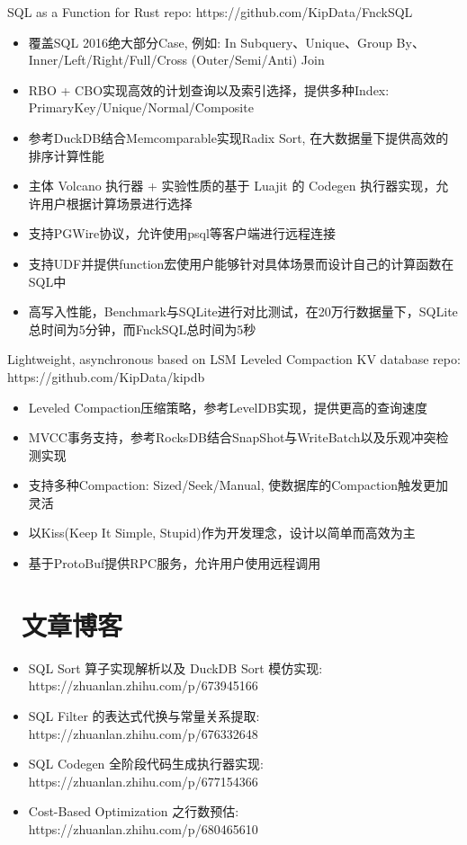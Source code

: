 \documentclass{resume}
\begin{document}
\begin{onehalfspacing}
  SQL as a Function for Rust  repo: https://github.com/KipData/FnckSQL
  \begin{itemize}
    \item 覆盖SQL 2016绝大部分Case, 例如: In Subquery、Unique、Group By、Inner/Left/Right/Full/Cross (Outer/Semi/Anti) Join
    \item RBO + CBO实现高效的计划查询以及索引选择，提供多种Index: PrimaryKey/Unique/Normal/Composite
    \item 参考DuckDB结合Memcomparable实现Radix Sort, 在大数据量下提供高效的排序计算性能
    \item 主体 Volcano 执行器 + 实验性质的基于 Luajit 的 Codegen 执行器实现，允许用户根据计算场景进行选择
    \item 支持PGWire协议，允许使用psql等客户端进行远程连接
    \item 支持UDF并提供function宏使用户能够针对具体场景而设计自己的计算函数在SQL中
    \item 高写入性能，Benchmark与SQLite进行对比测试，在20万行数据量下，SQLite总时间为5分钟，而FnckSQL总时间为5秒
  \end{itemize}
\end{onehalfspacing}

\begin{onehalfspacing}
  Lightweight, asynchronous based on LSM Leveled Compaction KV database  repo: https://github.com/KipData/kipdb
  \begin{itemize}
    \item Leveled Compaction压缩策略，参考LevelDB实现，提供更高的查询速度
    \item MVCC事务支持，参考RocksDB结合SnapShot与WriteBatch以及乐观冲突检测实现
    \item 支持多种Compaction: Sized/Seek/Manual, 使数据库的Compaction触发更加灵活
    \item 以Kiss(Keep It Simple, Stupid)作为开发理念，设计以简单而高效为主
    \item 基于ProtoBuf提供RPC服务，允许用户使用远程调用
  \end{itemize}
\end{onehalfspacing}

\section{\faUsers\ 文章博客}
\begin{itemize}
  \item SQL Sort 算子实现解析以及 DuckDB Sort 模仿实现: https://zhuanlan.zhihu.com/p/673945166
  \item SQL Filter 的表达式代换与常量关系提取: https://zhuanlan.zhihu.com/p/676332648
  \item SQL Codegen 全阶段代码生成执行器实现: https://zhuanlan.zhihu.com/p/677154366
  \item Cost-Based Optimization 之行数预估: https://zhuanlan.zhihu.com/p/680465610
\end{itemize}
\end{document}
